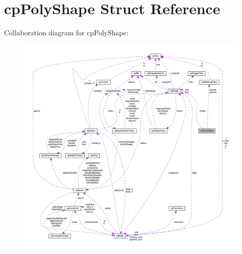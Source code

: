 \hypertarget{structcpPolyShape}{}\section{cp\+Poly\+Shape Struct Reference}
\label{structcpPolyShape}


Collaboration diagram for cp\+Poly\+Shape\+:
\nopagebreak
\begin{figure}[H]
\begin{center}
\leavevmode
\includegraphics[width=350pt]{structcpPolyShape__coll__graph}
\end{center}
\end{figure}
